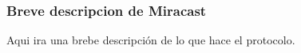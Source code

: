 \begin{frame}
\frametitle{Breve descripcion de Miracast}
Aqui ira una brebe descripción de lo que hace el protocolo.
\end{frame}
